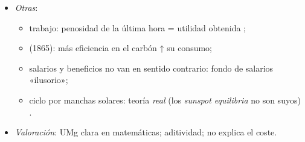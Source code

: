 \documentclass{article}
\begin{document}
\begin{columnas}
\begin{itemize}
\item \emph{Otras}:
  \begin{itemize}
  \item trabajo: penosidad de la última hora = utilidad obtenida ;
  \item {} (1865): más eficiencia en el carbón ↑ su consumo;
  \item salarios y beneficios no van en sentido contrario: fondo de salarios «ilusorio»;
  \item ciclo por manchas solares: teoría \emph{real} (los \emph{sunspot equilibria} no son suyos) .
  \end{itemize}
\item \emph{Valoración}: UMg clara en matemáticas; aditividad; no explica el coste.
\end{itemize}


\end{columnas}
\end{document}
